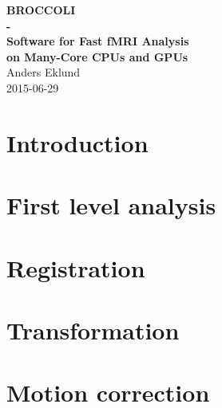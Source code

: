 \documentclass[11pt,a4paper]{book}
\makeatletter
\def\cleardoublepage{\clearpage\if@twoside \ifodd\c@page\else
\hbox{}
\thispagestyle{empty}     
\newpage 
\if@twocolumn\hbox{}\newpage\fi\fi\fi}
\makeatother
\begin{document}



\thispagestyle{empty}
\makeatletter
\begin{center}
  {\huge \textbf{BROCCOLI \\ - \\ Software for Fast fMRI Analysis \\ on Many-Core CPUs and GPUs}}\\[1 cm]
  {\Large Anders Eklund}\\[1.5 cm]
  {\Large 2015-06-29}\\[1.5 cm]
\end{center}


\renewcommand{\contentsname}{Table of Contents}
\tableofcontents



%


\chapter{Introduction}
\label{sec:intro}


\cleardoublepage
\newpage
\chapter{First level analysis}
\label{sec:firstlevel}


\cleardoublepage
\newpage
\chapter{Registration}
\label{sec:registration}


\cleardoublepage
\newpage
\chapter{Transformation}
\label{sec:transformation}


\cleardoublepage
\newpage
\chapter{Motion correction}
\label{sec:motion}

\end{document}

